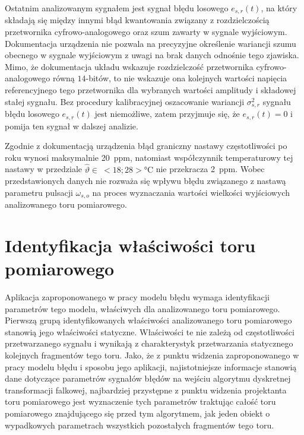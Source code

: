 Ostatnim analizowanym sygnałem jest sygnał błędu losowego $e_{s,r}(t)$, na który składają się między innymi błąd kwantowania związany z rozdzielczością przetwornika cyfrowo-analogowego oraz szum zawarty w sygnale wyjściowym. Dokumentacja urządzenia nie pozwala na precyzyjne określenie wariancji szumu obecnego w sygnale wyjściowym z uwagi na brak danych odnośnie tego zjawiska. Mimo, że dokumentacja układu wskazuje rozdzielczość przetwornika cyfrowo-analogowego równą $14$-bitów, to nie wskazuje ona kolejnych wartości napięcia referencyjnego tego przetwornika dla wybranych wartości amplitudy i składowej stałej sygnału. Bez procedury kalibracyjnej oszacowanie wariancji $\sigma_{s,r}^{2}$ sygnału błędu losowego $e_{s,r}(t)$ jest niemożliwe, zatem przyjmuje się, że $e_{s,r}(t) = 0$ i pomija ten sygnał w dalszej analizie.

Zgodnie z dokumentacją urządzenia błąd graniczny nastawy częstotliwości po roku wynosi maksymalnie \qty{20}{ppm}, natomiast współczynnik temperaturowy tej nastawy w przedziale $\hat{\vartheta} \in~<18;28>\unit{\degreeCelsius}$ nie przekracza \qty{2}{ppm}. Wobec przedstawionych danych nie rozważa się wpływu błędu związanego z nastawą parametru pulsacji $\omega_{s,o}$ na proces wyznaczania wartości wielkości wyjściowych analizowanego toru pomiarowego.

\section{Identyfikacja właściwości toru pomiarowego}

Aplikacja zaproponowanego w pracy modelu błędu wymaga identyfikacji parametrów tego modelu, właściwych dla analizowanego toru pomiarowego. Pierwszą grupą identyfikowanych właściwości analizowanego toru pomiarowego stanowią jego właściwości statyczne. Właściwości te nie zależą od częstotliwości przetwarzanego sygnału i wynikają z charakterystyk przetwarzania statycznego kolejnych fragmentów tego toru. Jako, że z punktu widzenia zaproponowanego w pracy modelu błędu i sposobu jego aplikacji, najistotniejsze informacje stanowią dane dotyczące parametrów sygnałów błędów na wejściu algorytmu dyskretnej transformacji falkowej, najbardziej przystępne z punktu widzenia projektanta toru pomiarowego jest wyznaczenie tych parametrów traktując całość toru pomiarowego znajdującego się przed tym algorytmem, jak jeden obiekt o wypadkowych parametrach wszystkich pozostałych fragmentów tego toru.

